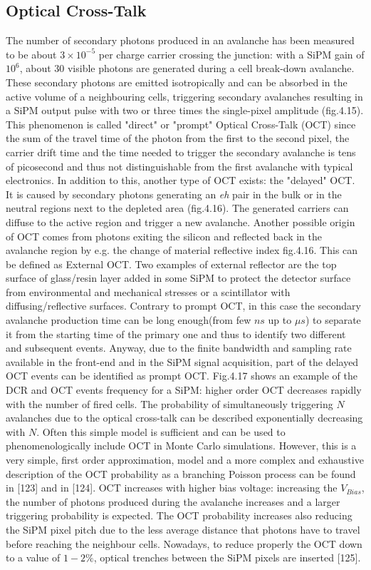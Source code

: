 \subsection{Optical Cross-Talk}
The number of secondary photons produced in an avalanche has been measured to be about $3\times 10^{-5}$ per charge carrier crossing the junction:  with a SiPM gain of $10^6$, about $30$ visible photons are generated during a cell break-down avalanche.
These secondary photons are emitted isotropically and can be absorbed in the active volume of a neighbouring cells, triggering secondary avalanches resulting in a SiPM output pulse with two or three times the single-pixel amplitude (fig.4.15).
This phenomenon is called "direct" or "prompt" Optical Cross-Talk (OCT) since the sum of the travel time of the photon from the first to the second pixel, the carrier drift time and the time needed to trigger the secondary avalanche is tens of picosecond and thus not distinguishable from the first avalanche with typical electronics.
In addition to this, another type of OCT exists:  the "delayed" OCT.
It is caused by secondary photons generating an \textit{eh} pair in the bulk or in the neutral regions next to the depleted area (fig.4.16).
The generated carriers can diffuse to the active region and trigger a new avalanche.
Another possible origin of OCT comes from photons exiting the silicon and reflected back in the avalanche region by e.g. the change of material reflective index fig.4.16.
This can be defined as External OCT.
Two examples of external reflector are the top surface of glass/resin layer added in some SiPM to protect the detector surface from environmental and mechanical stresses or a scintillator with diffusing/reflective surfaces.
Contrary to prompt OCT, in this case the secondary avalanche production time can be long enough(from few $ns$ up to $\mu s$) to separate it from the starting time of the primary one and thus to identify two different and subsequent events.
Anyway, due to the finite bandwidth and sampling rate available in the front-end and in the SiPM signal acquisition, part of the delayed OCT events can be identified as prompt OCT.
Fig.4.17 shows an example of the DCR and OCT events frequency for a SiPM: higher order OCT decreases rapidly with the number of fired cells.
The probability of simultaneously triggering $N$ avalanches due to the optical cross-talk can be described exponentially decreasing with $N$. Often this simple model is sufficient and can be used to phenomenologically include OCT in Monte Carlo simulations.
However, this is a very simple, first order approximation, model and a more complex and exhaustive description of the OCT probability as a branching Poisson process can be found in [123] and in [124].
OCT increases with higher bias voltage: increasing the $V_{Bias}$, the number of photons produced during the avalanche increases and a larger triggering probability is expected.
The OCT probability increases also reducing the SiPM pixel pitch due to the less average distance that photons have to travel before reaching the neighbour cells.
Nowadays, to reduce properly the OCT down to a value of $1-2\%$, optical trenches between the SiPM pixels are inserted [125].